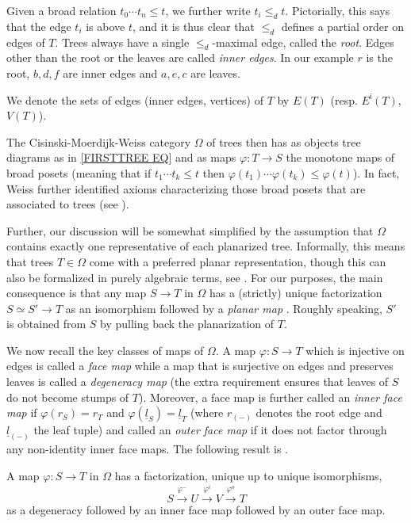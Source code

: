 \documentclass[a4paper,10pt,draft]{article}%
\begin{document}
Given a broad relation $t_0 \cdots t_n \leq t$,
we further write $t_i \leq_d t$.
Pictorially, this says that the edge $t_i$ is above $t$,
and it is thus clear that $\leq_d$ defines a partial order on edges of $T$.
Trees always have a single $\leq_d$-maximal edge, called the \textit{root}. Edges other than the root or the leaves are called \textit{inner edges}. In our example $r$ is the root, $b,d,f$ are inner edges and $a,e,c$ are leaves. 

We denote the sets of edges (inner edges, vertices) of $T$ by
$E(T)$ (resp. $E^{\mathsf{i}}(T)$, $V(T)$).

The Cisinski-Moerdijk-Weiss category $\Omega$ of trees then has as objects tree diagrams as in \eqref{FIRSTTREE EQ}
and as maps $\varphi \colon T \to S$ the monotone maps of broad posets
(meaning that if $t_1 \cdots t_k \leq t$ then
$\varphi(t_1) \cdots \varphi(t_k) \leq \varphi(t)$).
In fact, Weiss further identified axioms characterizing those broad posets that are associated to trees (see \cite[Defs. 5.1 and 5.9]{Per17}).

Further, our discussion will be somewhat simplified by the assumption that $\Omega$
contains exactly one representative of each planarized tree.
Informally, this means that trees $T \in \Omega$
come with a preferred planar representation,
though this can also be formalized in purely algebraic terms, see \cite[\S 3.1]{BP17}.
For our purposes, the main consequence is that any map 
$S \to T$ in $\Omega$ has a (strictly) unique factorization
$S \simeq S' \to T$ as an isomorphism followed by a \textit{planar map} \cite[Prop. 3.21]{BP17}. 
Roughly speaking, $S'$ is obtained from $S$
by pulling back the planarization of $T$.

We now recall the key classes of maps of $\Omega$.
A map $\varphi \colon S \to T$ which is injective on edges is called a \textit{face map}
while a map that is surjective on edges and preserves leaves is called a \textit{degeneracy map}
(the extra requirement ensures that leaves of $S$ do not become stumps of $T$).
Moreover, a face map is further called an \textit{inner face map}
if $\varphi(r_S) = r_T$ and 
$\varphi(\underline{l}_S) = \underline{l}_T$ 
(where $r_{(-)}$ denotes the root edge and $\underline{l}_{(-)}$ the leaf tuple)
and called an \textit{outer face map} if it does not factor through any non-identity inner face maps.
The following result is \cite[Cor. 3.32]{Per17}.
\begin{proposition}\label{UNIQUEFACT PROP}
	A map $\varphi \colon S \to T$ in $\Omega$ has a factorization, unique up to unique isomorphisms,
\[
	S \xrightarrow{\varphi^{-}}
	U \xrightarrow{\varphi^{i}}
	V \xrightarrow{\varphi^{o}}
	T	
\]
as a degeneracy followed by an inner face map followed by an outer face map.
\end{proposition}
\end{document}

